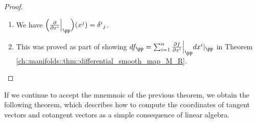 \begin{proof}
\mbox{} \\
    \begin{enumerate}
        \item We have $\Big(\frac{\pd}{\pd x^i}\Big|_\pp\Big)(x^j) = \delta^i{}_j$.
        \item This was proved as part of showing $ df_\pp = \sum_{i = 1}^n \frac{\pd f}{\pd x^i}\Big|_\pp dx^i|_\pp$ in Theorem \ref{ch::manifolds::thm::differential_smooth_map_M_R}.
    \end{enumerate}
\end{proof}

If we continue to accept the mnemnoic of the previous theorem, we obtain the following theorem, which describes how to compute the coordinates of tangent vectors and cotangent vectors as a simple consequence of linear algebra.

